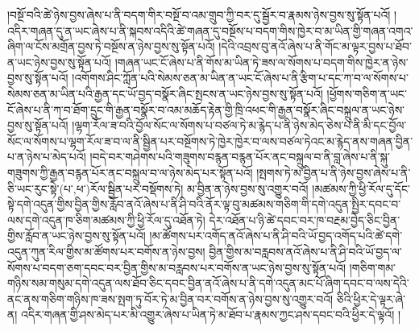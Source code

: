 །བསྔོ་བའི་ཚེ་ཉེས་བྱས་ཞེས་པ་ནི་བདག་གིར་བསྔོ་བ་འམ་གྲུབ་ཀྱི་བར་དུ་སྦྱོར་བ་རྣམས་ཉེས་བྱས་སུ་སྟོན་པའོ། །འདིར་གཞན་དུ་ན་ཡང་ཞེས་པ་ནི་སྐབས་འདིའི་ཚེ་གཞན་དུ་བསྔོས་པ་བདག་གིས་ཁྱེར་བ་མ་ཡིན་གྱི་གཞན་འགའ་ཞིག་ལ་ངོས་མགྲོན་བྱས་ཏེ་བསྔོས་ན་ཉེས་བྱས་སུ་སྟོན་པའོ། །དེའི་འབྲས་བུ་ནའོ་ཞེས་པ་ནི་གོང་མ་ལྟར་བྱས་པ་ཐོབ་ན་ཡང་ཉེས་བྱས་སུ་སྟོན་པའོ། །གཞན་ཡང་ངོ་ཞེས་པ་ནི་གོས་མ་ཡིན་ཏེ་ཟས་ལ་སོགས་པ་བདག་གིས་ཁྱེར་ན་ཉེས་བྱས་སུ་སྟོན་པའོ། །འགོགས་ཤིང་ཀློན་པའི་སེམས་ཅན་མ་ཡིན་ན་ཡང་ངོ་ཞེས་པ་ནི་རྩིག་པ་དང་ཀ་བ་ལ་སོགས་པ་སེམས་ཅན་མ་ཡིན་པའི་རྒྱན་དང་ཡོ་བྱད་བསྣོར་ཞིང་སྤངས་ན་ཡང་ཉེས་བྱས་སུ་སྟོན་པའོ། །ཕྱོགས་གཅིག་ན་ཡང་ངོ་ཞེས་པ་ནི་ཀ་བ་ཐོག་དྲུང་གི་རྒྱན་བསྣོར་བ་འམ་མཆོད་རྟེན་གྱི་ཁྲི་འཕང་གི་རྒྱན་བསྣོར་ཞིང་བསྐྲུལ་ན་ཡང་ཉེས་བྱས་སུ་སྟོན་པའོ། །ལྷག་རོལ་ཟ་བའི་བྱོལ་སོང་ལ་སོགས་པ་བཙལ་ཏེ་མ་རྙེད་པ་ནི་ཉེས་མེད་ཅེས་པ་ནི་མི་དང་བྱོལ་སོང་ལ་སོགས་པ་ལྷག་རོལ་ཟ་བ་ལ་ནི་སྦྱིན་པར་བསྔོགས་ཏེ་ཁྱེར་ཁྱེར་བ་ལས་བཙལ་ཏེའང་མ་རྙེད་ནས་གཞན་བྱིན་པ་ན་ཉེས་པ་མེད་པའོ། །བདེ་བར་གཤེགས་པའི་གཟུགས་བརྙན་བརྙན་པོར་ནང་བསྐྲུལ་བ་ནི་བླ་ཞེས་པ་ནི་སྐུ་གཟུགས་ཀྱི་རྒྱན་བརྙན་པོར་ནང་བསྐྲུལ་བ་ལ་ཉེས་མེད་པར་སྟོན་པའོ། །སྤགས་ཏེ་མ་བྱིན་པ་ནི་ཉེས་བྱས་ཞེས་པ་ནི་ཅི་ཡང་རུང་སྟེ་(པ་‚ཕ་)རོལ་སྦྱིན་པར་བསྡོགས་ཏེ། མ་བྱིན་ན་ཉེས་བྱས་སུ་འགྱུར་བའོ། །མཚམས་ཀྱི་ཕྱི་རོལ་དུ་དོང་སྟེ་དགེ་འདུན་གྱིས་བྱིན་གྱིས་རློབ་ནའོ་ཞེས་པ་ནི་ཤི་བའི་ནོར་ལྟ་བུ་མཚམས་གཅིག་གི་དགེ་འདུན་སྤྱིར་དབང་བ་ལས་དགེ་འདུན་ཁ་ཅིག་མཚམས་ཀྱི་ཕྱི་རོལ་དུ་འཐོན་ཏེ། དེར་འཐོན་པ་ཉི་ཚེ་དབང་བར་ཁ་བརྔམ་བྱེད་ཅིང་བྱིན་གྱིས་རློབ་ན་ཡང་ཉེས་བྱས་སུ་སྟོན་པའོ། །མ་ཚོགས་པར་འགོད་ནའོ་ཞེས་པ་ནི་ཤི་བའི་ཡོ་བྱད་འགོད་པའི་ཚེ་དགེ་འདུན་ཀུན་རིལ་གྱིས་མ་ཚོགས་པར་བགོས་ན་ཉེས་བྱས། བྱིན་གྱིས་མ་བརླབས་ནའོ་ཞེས་པ་ནི་ཤི་བའི་ཡོ་བྱད་ལ་སོགས་པ་བདག་ཅག་དབང་བར་བྱིན་གྱིས་མ་བརླབས་པར་བགོས་ན་ཡང་ཉེས་བྱས་སུ་སྟོན་པའོ། །གཅིག་གམ་གཉིས་སམ་གསུམ་དགེ་འདུན་ལས་ཐོབ་ཅིང་དབང་བྱིན་ནའོ་ཞེས་པ་ནི་དགེ་འདུན་མང་པོ་ཞིག་དབང་བ་ལས་དེའི་ནང་ནས་གཅིག་གཉིས་ཁ་ཟས་སྤག་ཏུ་བོར་ཏེ་མ་བྱིན་བར་བགོས་ན་ཉེས་བྱས་སུ་འགྱུར་བའོ། ཅིའི་ཕྱིར་དེ་ལྟར་ཞེ་ན། འདིར་གཞན་གྱི་ཤས་མེད་པར་མི་འགྱུར་ཞེས་པ་ཡིན་ཏེ་མ་ཐོབ་པ་རྣམས་ཀྱང་ཤས་དབང་བའི་ཕྱིར་དེ་ལྟའོ། །
